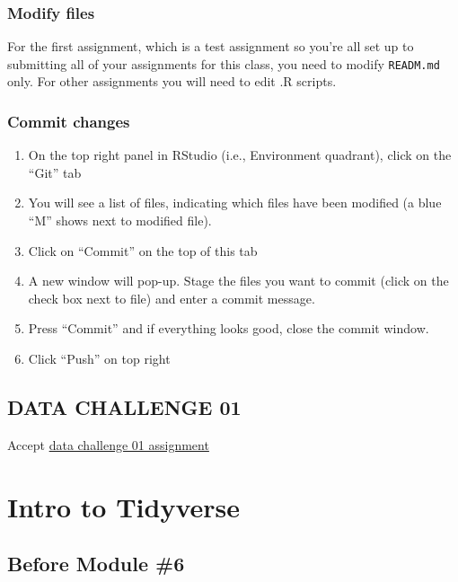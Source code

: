 \documentclass[
]{book}
\begin{document}
\hypertarget{modify-files}{%
\subsection{Modify files}\label{modify-files}}

For the first assignment, which is a test assignment so you're all set up to submitting all of your assignments for this class, you need to modify \texttt{READM.md} only. For other assignments you will need to edit .R scripts.

\hypertarget{commit-changes}{%
\subsection{Commit changes}\label{commit-changes}}

\begin{enumerate}
\def\labelenumi{\arabic{enumi}.}
\item
  On the top right panel in RStudio (i.e., Environment quadrant), click on the ``Git'' tab
\item
  You will see a list of files, indicating which files have been modified (a blue ``M'' shows next to modified file).
\item
  Click on ``Commit'' on the top of this tab
\item
  A new window will pop-up. Stage the files you want to commit (click on the check box next to file) and enter a commit message.
\item
  Press ``Commit'' and if everything looks good, close the commit window.
\item
  Click ``Push'' on top right
\end{enumerate}

\hypertarget{data-challenge-01}{%
\section{DATA CHALLENGE 01}\label{data-challenge-01}}

Accept \href{https://classroom.github.com/a/zjVO8fZw}{data challenge 01 assignment}

\hypertarget{intro-to-tidyverse}{%
\chapter{Intro to Tidyverse}\label{intro-to-tidyverse}}

\hypertarget{before-module-6}{%
\section{Before Module \#6}\label{before-module-6}}
\end{document}
